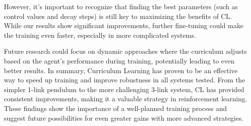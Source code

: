 

However, it’s important to recognize that finding the best parameters (such as control values and decay steps) is still key to maximizing the benefits of CL. While our results show significant improvements, further fine-tuning could make the training even faster, especially in more complicated systems. 

Future research could focus on dynamic approaches where the curriculum adjusts based on the agent's performance during training, potentially leading to even better results.
In summary, Curriculum Learning has proven to be an effective way to speed up training and improve robustness in all systems tested. From the simpler 1-link pendulum to the more challenging 3-link system, CL has provided consistent improvements, making it a valuable strategy in reinforcement learning. These findings show the importance of a well-planned training process and suggest future possibilities for even greater gains with more advanced strategies.
